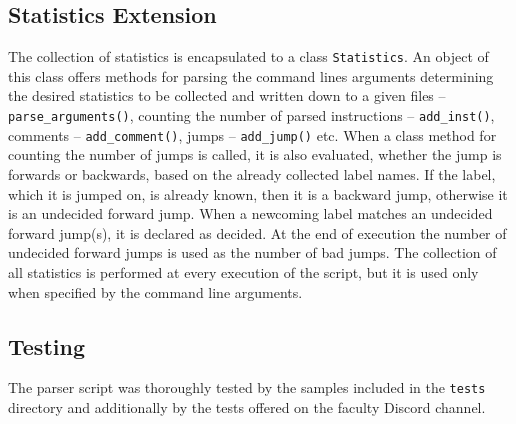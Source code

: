 \documentclass[10pt]{article}
\begin{document}
\subsection*{Statistics Extension}
The collection of statistics is encapsulated to a class \texttt{Statistics}. An object of this class offers methods for parsing the command lines arguments determining the desired statistics to be collected and written down to a given files -- \texttt{parse\_arguments()}, counting the number of parsed instructions -- \texttt{add\_inst()}, comments -- \texttt{add\_comment()}, jumps -- \texttt{add\_jump()} etc. When a class method for counting the number of jumps is called, it is also evaluated, whether the jump is forwards or backwards, based on the already collected label names. If the label, which it is jumped on, is already known, then it is a backward jump, otherwise it is an undecided forward jump. When a newcoming label matches an undecided forward jump(s), it is declared as decided. At the end of execution the number of undecided forward jumps is used as the number of bad jumps. The collection of all statistics is performed at every execution of the script, but it is used only when specified by the command line arguments.

\subsection*{Testing}
The parser script was thoroughly tested by the samples included in the \texttt{tests} directory and additionally by the tests offered on the faculty Discord channel.
\end{document}
